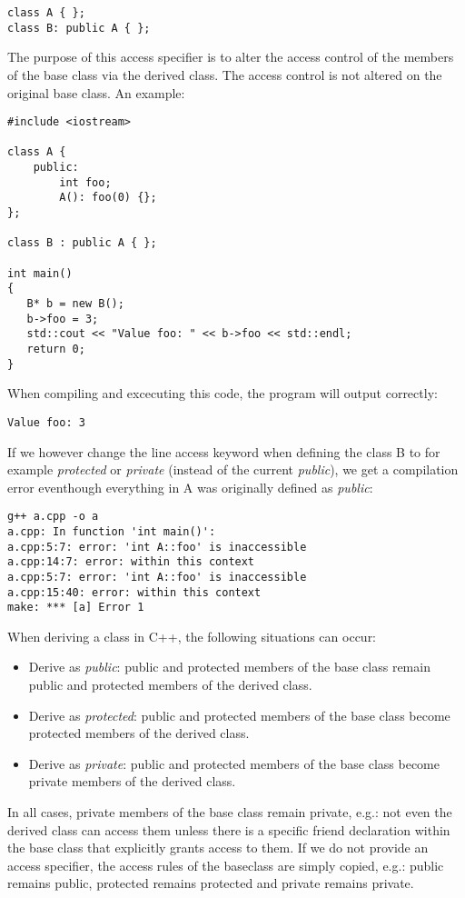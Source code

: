 \documentclass[10pt,a4paper,twocolumn]{article}
\begin{document}
\begin{lstlisting}
class A { };
class B: public A { };
\end{lstlisting}

The purpose of this access specifier is to alter the access control of the members of the base class via the derived class. The access control is not altered on the original base class. An example:

\begin{lstlisting}
#include <iostream>

class A {
	public:
		int foo;
		A(): foo(0) {};
};

class B : public A { };
 
int main()
{
   B* b = new B();
   b->foo = 3;
   std::cout << "Value foo: " << b->foo << std::endl;
   return 0;
}
\end{lstlisting}

When compiling and excecuting this code, the program will output correctly:
\begin{lstlisting}
Value foo: 3
\end{lstlisting}

If we however change the line access keyword when defining the class B to for example \textit{protected} or \textit{private} (instead of the current \textit{public}), we get a compilation error eventhough everything in A was originally defined as \textit{public}: 

\begin{lstlisting}
g++ a.cpp -o a
a.cpp: In function 'int main()':
a.cpp:5:7: error: 'int A::foo' is inaccessible
a.cpp:14:7: error: within this context
a.cpp:5:7: error: 'int A::foo' is inaccessible
a.cpp:15:40: error: within this context
make: *** [a] Error 1
\end{lstlisting}

When deriving a class in C++, the following situations can occur:
\begin{itemize}
\item Derive as \textit{public}: public and protected members of the base class remain public and protected members of the derived class.
\item Derive as \textit{protected}: public and protected members of the base class become protected members of the derived class.
\item Derive as \textit{private}: public and protected members of the base class become private members of the derived class.
\end{itemize}
In all cases, private members of the base class remain private, e.g.: not even the derived class can access them unless there is a specific friend declaration within the base class that explicitly grants access to them. If we do not provide an access specifier, the access rules of the baseclass are simply copied, e.g.: public remains public, protected remains protected and private remains private.
\end{document}
